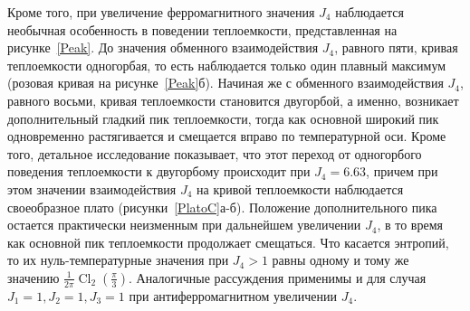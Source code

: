 \documentclass[utf8,12pt]{jetp}
\DeclareMathOperator{\Cl}{Cl}
\begin{document}
Кроме того, при увеличение ферромагнитного значения $J_4$ наблюдается необычная особенность в поведении теплоемкости, представленная на рисунке~\ref{Peak}. До значения обменного взаимодействия $J_4$, равного пяти, кривая теплоемкости одногорбая, то есть наблюдается только один плавный максимум (розовая кривая на рисунке~\ref{Peak}б). Начиная же с обменного взаимодействия $J_4$, равного восьми, кривая теплоемкости становится двугорбой, а именно, возникает дополнительный гладкий пик теплоемкости, тогда как основной широкий пик одновременно растягивается и смещается вправо по температурной оси. Кроме того, детальное исследование показывает, что этот переход от одногорбого поведения теплоемкости к двугорбому происходит при $J_4=6.63$, причем при этом значении взаимодействия $J_4$ на кривой теплоемкости наблюдается своеобразное плато (рисунки~\ref{PlatoC}а-б). Положение дополнительного пика остается практически неизменным при дальнейшем увеличении $J_4$, в то время как основной пик теплоемкости продолжает смещаться. Что касается энтропий, то их нуль-температурные значения при $J_4>1$ равны одному и тому же значению $\frac{1}{2\pi} \Cl_2 (\frac{\pi}{3})$. Аналогичные рассуждения применимы и для случая $J_1 = 1, J_2 = 1, J_3 = 1$ при антиферромагнитном увеличении $J_4$.
\end{document}
